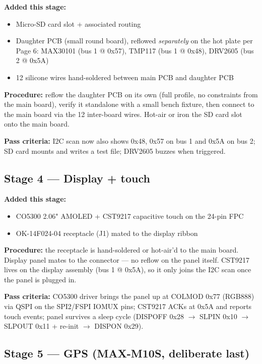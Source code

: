 \documentclass[11pt,a4paper]{article}
\begin{document}
\textbf{Added this stage:}
\begin{itemize}[nosep]
\item Micro-SD card slot + associated routing
\item Daughter PCB (small round board), reflowed \emph{separately} on the hot plate per Page 6: MAX30101 (bus 1 @ 0x57), TMP117 (bus 1 @ 0x48), DRV2605 (bus 2 @ 0x5A)
\item 12 silicone wires hand-soldered between main PCB and daughter PCB
\end{itemize}

\textbf{Procedure:} reflow the daughter PCB on its own (full profile, no constraints from the main board), verify it standalone with a small bench fixture, then connect to the main board via the 12 inter-board wires. Hot-air or iron the SD card slot onto the main board.

\textbf{Pass criteria:} I2C scan now also shows 0x48, 0x57 on bus 1 and 0x5A on bus 2; SD card mounts and writes a test file; DRV2605 buzzes when triggered.

\subsection*{Stage 4 — Display + touch}

\textbf{Added this stage:}
\begin{itemize}[nosep]
\item CO5300 2.06" AMOLED + CST9217 capacitive touch on the 24-pin FPC
\item OK-14F024-04 receptacle (J1) mated to the display ribbon
\end{itemize}

\textbf{Procedure:} the receptacle is hand-soldered or hot-air'd to the main board. Display panel mates to the connector --- no reflow on the panel itself. CST9217 lives on the display assembly (bus 1 @ 0x5A), so it only joins the I2C scan once the panel is plugged in.

\textbf{Pass criteria:} CO5300 driver brings the panel up at COLMOD 0x77 (RGB888) via QSPI on the SPI2/FSPI IOMUX pins; CST9217 ACKs at 0x5A and reports touch events; panel survives a sleep cycle (DISPOFF 0x28 $\rightarrow$ SLPIN 0x10 $\rightarrow$ SLPOUT 0x11 + re-init $\rightarrow$ DISPON 0x29).

\subsection*{Stage 5 — GPS (MAX-M10S, deliberate last)}
\end{document}
